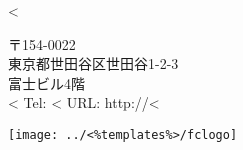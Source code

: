 \parbox[t]{.50\textwidth}{
\vspace{0.3cm}
<%
}
\parbox[t]{.38\textwidth}{
\vspace{0.3cm}
        {〒154-0022 \\
        東京都世田谷区世田谷1-2-3 \\
        富士ビル4階 \\
        \Large <%
        \normalsize    Tel: <%
                                URL: http://<%
        }
}
\parbox[t]{.10\textwidth}{
\vspace{0.2cm}
   \texttt{[image: ../<\%templates\%>/fclogo]}
}
